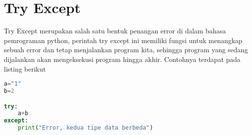 \section{Try Except}
Try Except merupakan salah satu bentuk penangan error di dalam bahasa pemrograman python, perintah try except ini memiliki fungsi untuk menangkap sebuah error dan tetap menjalankan program kita, sehingga program yang sedang dijalankan akan mengeksekusi program hingga akhir. Contohnya terdapat pada listing berikut
\begin{lstlisting}[language=Python]
a="1"
b=2

try:
	a+b
except:
	print("Error, kedua tipe data berbeda")
\end{lstlisting}